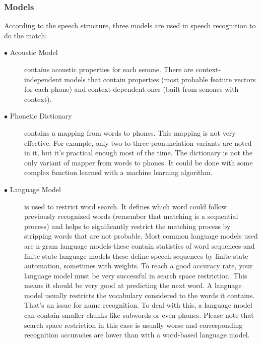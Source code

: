 \documentclass[12pt,a4paper,oldfontcommands]{memoir}
\begin{document}
\subsubsection{Models}
According to the speech structure, three models are used in speech recognition to do the match:
\begin{description}
  \item[$\bullet$ Acoustic Model] contains acoustic properties for each senone. There are context-independent models that contain properties (most probable feature vectors for each phone) and context-dependent ones (built from senones with context). 
  \item[$\bullet$ Phonetic Dictionary]
contains a mapping from words to phones. This mapping is not very effective. For example, only two to three pronunciation variants are noted in it, but it's practical enough most of the time. The dictionary is not the only variant of mapper from words to phones. It could be done with some complex function learned with a machine learning algorithm. 

  \item[$\bullet$ Language Model]
	is used to restrict word search. It defines which word could follow previously recognized words (remember that matching is a sequential process) and helps to significantly restrict the matching process by stripping words that are not probable. Most common language models used are n-gram language models-these contain statistics of word sequences-and finite state language models-these define speech sequences by finite state automation, sometimes with weights. To reach a good accuracy rate, your language model must be very successful in search space restriction. This means it should be very good at predicting the next word. A language model usually restricts the vocabulary considered to the words it contains. That's an issue for name recognition. To deal with this, a language model can contain smaller chunks like subwords or even phones. Please note that search space restriction in this case is usually worse and corresponding recognition accuracies are lower than with a word-based language model\cite{7}.

\end{description}
\end{document}
